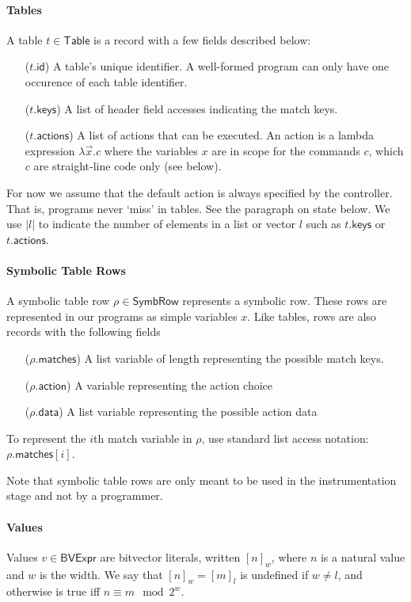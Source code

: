\documentclass{article}
\newcommand{\BVExpr}{\mathsf{BVExpr}}
\newcommand{\Table}{\mathsf{Table}}
\newcommand{\SymbRow}{\mathsf{SymbRow}}
\newcommand{\matches}{\mathsf{matches}}
\newcommand{\action}{\mathsf{action}}
\newcommand{\actions}{\mathsf{actions}}
\newcommand{\keys}{\mathsf{keys}}
\newcommand{\data}{\mathsf{data}}
\newcommand{\id}{\mathsf{id}}
\begin{document}
\paragraph{Tables}
A table $t \in \Table$ is a record with a few fields described below:
\begin{enumerate}[align=left]
  \item[($t.\id$)] A table's unique identifier. A well-formed program can only have
    one occurence of each table identifier.
  \item[($t.\keys$)] A list of header field accesses indicating the match keys.
  \item[($t.\actions$)] A list of actions that can be executed. An action is a lambda
    expression $\lambda \vec x. c$ where the variables $x$ are in scope for the
    commands $c$, which $c$ are straight-line code only (see below).
\end{enumerate}
For now we assume that the default action is always specified by the controller.
That is, programs never `miss' in tables. See the paragraph on state below. We use $|l|$ to indicate the number of
elements in a list or vector $l$ such as $t.\keys$ or $t.\actions$.

\paragraph{Symbolic Table Rows}
A symbolic table row $\rho \in \SymbRow$ represents a symbolic row. These rows are represented in our programs as simple variables $x$. Like tables,
rows are also records with the following fields 
\begin{enumerate}[align=left]
  \item[($\rho.\matches$)] A list variable of length representing the possible match keys.
  \item[($\rho.\action$)] A variable representing the action choice
  \item[($\rho.\data$)] A list variable representing the possible action data
\end{enumerate}

To represent the $i$th match variable in $\rho$, use standard list
access notation: $\rho.\matches[i]$.

Note that symbolic table rows are only meant to be used in the instrumentation
stage and not by a programmer.

\paragraph{Values}
Values $v \in \BVExpr$ are bitvector literals, written $[n]_w$, where $n$
is a natural value and $w$ is the width. We say that $[n]_w = [m]_l$ is
undefined if $w \neq l$, and otherwise is true iff $n \equiv m \mod 2^w$.
\end{document}
